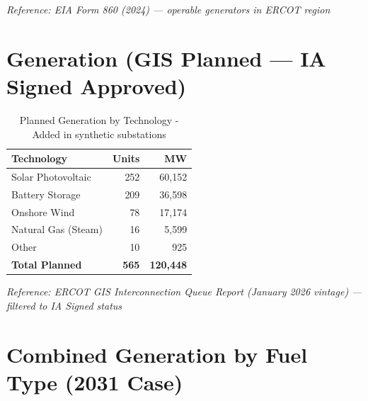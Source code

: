 \documentclass[11pt]{article}
\begin{document}
\noindent\textit{Reference: EIA Form 860 (2024) --- operable generators in ERCOT region}

\section{Generation (GIS Planned --- IA Signed Approved)}

\begin{table}[H]
\centering
\caption{Planned Generation by Technology - Added in synthetic substations}
\begin{tabular}{lrr}
\toprule
\textbf{Technology} & \textbf{Units} & \textbf{MW} \\
\midrule
Solar Photovoltaic   & 252 & 60,152 \\
Battery Storage      & 209 & 36,598 \\
Onshore Wind         & 78  & 17,174 \\
Natural Gas (Steam)  & 16  & 5,599 \\
Other                & 10  & 925 \\
\midrule
\textbf{Total Planned} & \textbf{565} & \textbf{120,448} \\
\bottomrule
\end{tabular}
\end{table}

\noindent\textit{Reference: ERCOT GIS Interconnection Queue Report (January 2026 vintage) --- filtered to IA Signed status}

\section{Combined Generation by Fuel Type (2031 Case)}
\end{document}
